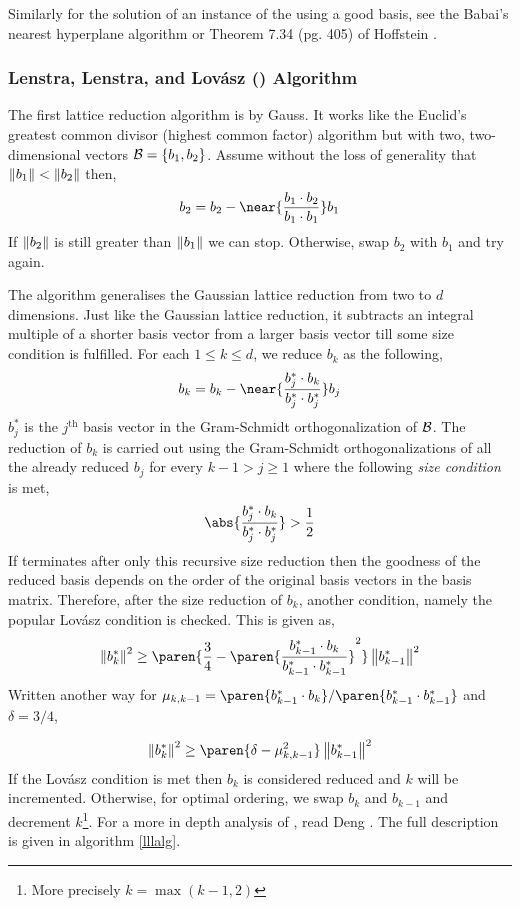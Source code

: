 \documentclass{homework}
\begin{document}
Similarly for the solution of an instance of the \CVP{} using a good
basis, see the Babai's nearest hyperplane algorithm
\cite{babai1986lovasz} or Theorem 7.34 (pg. 405) of Hoffstein
\cite{hoffstein2008introduction}.

\subsubsection{Lenstra, Lenstra, and Lov\'asz (\LLL) Algorithm} The
first lattice reduction algorithm is by Gauss. It works like the
Euclid's greatest common divisor (highest common factor) algorithm but
with two, two-dimensional vectors \ie $\mathcal{B} = \{b_1, b_2\}$. Assume
without the loss of generality that $\left\lVert b_1\right\rVert < \left\lVert b_2\right\rVert$ then,
\[
  b_2 = b_2 - \near{\frac{b_1 \cdot b_2}{b_1 \cdot b_1}}b_1
\]
If $\left\lVert b_2\right\rVert$ is still greater than $\left\lVert b_1\right\rVert$ we can
stop. Otherwise, swap $b_2$ with $b_1$ and try again.

The \LLL{} algorithm generalises the Gaussian lattice reduction from
two to $d$ dimensions. Just like the Gaussian lattice reduction, it
subtracts an integral multiple of a shorter basis vector from a larger
basis vector till some size condition is fulfilled. For each
$1 \leq k \leq d$, we reduce $b_k$ as the following,
\[
  b_k = b_k - \near{\frac{b_j^* \cdot b_k}{b_j^* \cdot b_j^*}}b_j
\]
$b_j^*$ is the $j^\text{th}$ basis vector in the Gram-Schmidt
orthogonalization of $\mathcal{B}$. The reduction of $b_k$ is carried out using
the Gram-Schmidt orthogonalizations of all the already reduced $b_j$
for every $k - 1 > j \geq 1$ where the following \textit{size
  condition} is met,
\[
  \abs{\frac{b_j^* \cdot b_k}{b_j^* \cdot b_j^*}} > \frac{1}{2}
\]
If \LLL{} terminates after only this recursive size reduction then the
goodness of the reduced basis depends on the order of the original
basis vectors in the basis matrix. Therefore, after the size reduction
of $b_k$, another condition, namely the popular Lov\'asz condition is
checked. This is given as,
\[
  \norm{b_k^*}^2 \geq \paren{
    \frac{3}{4} - \paren{
      \frac{b_{k-1}^* \cdot b_k}{b_{k-1}^* \cdot b_{k-1}^*}
    }^2
  }
  \norm{b_{k-1}^*}^2
\]
Written another way for $\mu_{k, k-1} =
\paren{b_{k-1}^* \cdot b_k}/
\paren{b_{k-1}^* \cdot b_{k-1}^*}$ and $\delta = 3/4$,

\[
  \norm{b_k^*}^2 \geq \paren{\delta - \mu_{k, k-1}^2}\norm{b_{k-1}^*}^2
\]
If the Lov\'asz condition is met then $b_k$ is considered reduced and
$k$ will be incremented. Otherwise, for optimal ordering, we swap
$b_k$ and $b_{k-1}$ and decrement $k$\footnote{More precisely
  $k = \max(k - 1, 2)$}. For a more in depth analysis of \LLL{}, read
Deng \cite{deng2016introduction}. The full description is given in
algorithm \ref{lllalg}.
\end{document}
